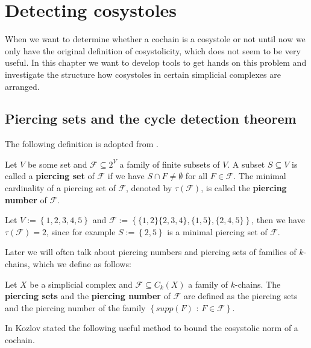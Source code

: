
\chapter{Detecting cosystoles}

\label{Chapter2}

When we want to determine whether a cochain is a cosystole or not until now we only have the original definition of cosystolicity, which does not seem to be very useful. In this chapter we want to develop tools to get hands on this problem and investigate the structure how cosystoles in certain simplicial complexes are arranged.

\section{Piercing sets and the cycle detection theorem}

The following definition is adopted from \cite{6}.

\begin{defi}
Let \(V\) be some set and \(\mathcal{F}\subseteq 2^V\) a family of finite subsets of \(V\). A subset \(S\subseteq V\) is called a \textbf{piercing set} of \(\mathcal{F}\) if we have \(S\cap F\neq\emptyset\) for all \(F\in\mathcal{F}\). The minimal cardinality of a piercing set of \(\mathcal{F}\), denoted by \(\tau(\mathcal{F})\), is called the \textbf{piercing number} of \(\mathcal{F}\).
\end{defi}

\begin{expl}
Let \(V:=\left\{1,2,3,4,5\right\}\) and \(\mathcal{F}:=\left\{\{1,2\}\{2,3,4\},\{1,5\},\{2,4,5\}\right\}\), then we have \(\tau(\mathcal{F})=2\), since for example \(S:=\left\{2,5\right\}\) is a minimal piercing set of \(\mathcal{F}\).
\end{expl}

Later we will often talk about piercing numbers and piercing sets of families of \(k\)-chains, which we define as follows:

\begin{defi}
Let \(X\) be a simplicial complex and \(\mathcal{F}\subseteq C_k(X)\) a family of \(k\)-chains. The \textbf{piercing sets} and the \textbf{piercing number} of \(\mathcal{F}\) are defined as the piercing sets and the piercing number of the family \(\left\{supp(F)\text{ : }F\in\mathcal{F}\right\}\).
\end{defi}

In \cite{6} Kozlov stated the following useful method to bound the cosystolic norm of a cochain.

